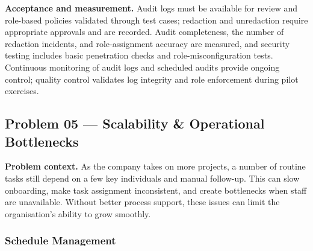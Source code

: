 \documentclass[12pt,a4paper]{report}
\begin{document}
\textbf{Acceptance and measurement.} Audit logs must be available for review and role-based policies validated through test cases; redaction and unredaction require appropriate approvals and are recorded. Audit completeness, the number of redaction incidents, and role-assignment accuracy are measured, and security testing includes basic penetration checks and role-misconfiguration tests. Continuous monitoring of audit logs and scheduled audits provide ongoing control; quality control validates log integrity and role enforcement during pilot exercises.

\subsection{Problem 05 --- Scalability \& Operational Bottlenecks}

\textbf{Problem context.} As the company takes on more projects, a number of routine tasks still depend on a few key individuals and manual follow-up. This can slow onboarding, make task assignment inconsistent, and create bottlenecks when staff are unavailable. Without better process support, these issues can limit the organisation's ability to grow smoothly.

\subsubsection{Schedule Management}
\end{document}
